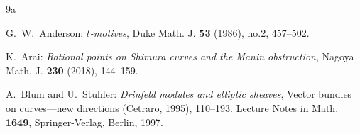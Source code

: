 \documentclass[10pt]{amsart}
\theoremstyle{plain}
\theoremstyle{definition}
\begin{document}


\begin{thebibliography}{9a}

G.~W.~Anderson:
\emph{$t$-motives},
Duke Math. J. \textbf{53} (1986), no.2, 457--502.
 

K.~Arai:
\emph{Rational points on Shimura curves and the Manin obstruction},
Nagoya Math. J. \textbf{230} (2018), 144--159.







A.~Blum and U.~Stuhler:
\emph{Drinfeld modules and elliptic sheaves}, Vector bundles on curves---new directions (Cetraro, 1995), 110--193.
Lecture Notes in Math. \textbf{1649}, Springer-Verlag, Berlin, 1997.








\end{thebibliography}
\end{document}
